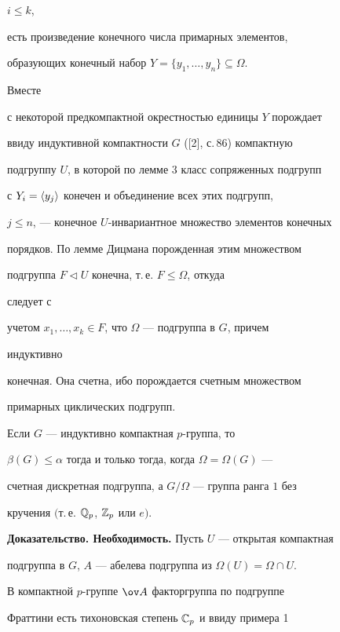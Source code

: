 $i\le k$, 


есть произведение конечного числа примарных элементов, 


образующих конечный набор $Y=\{y_1,\dotsc,y_n\}\subseteq\Omega$. 


Вместе 


с некоторой предкомпактной окрестностью единицы $Y$ порождает 


ввиду индуктивной компактности $G$ ([2], с.\,86) компактную 


подгруппу $U$, в которой по лемме 3 класс сопряженных подгрупп 


с $Y_i=\langle y_j\rangle$ конечен и объединение всех этих подгрупп, 


$j\le n$, --- конечное $U$-инвариантное множество элементов конечных 


порядков. По лемме Дицмана порожденная этим множеством  


подгруппа $F\triangleleft U$ конечна, т.\,е. $F\le\Omega$, откуда 


следует с  


учетом $x_1,\dotsc,x_k\in F$, что $\Omega$ --- подгруппа в $G$, причем 


индуктивно 


конечная. Она счетна, ибо порождается счетным множеством 


примарных циклических подгрупп. 


 


\begin{thm} 


Если $G$ --- индуктивно компактная $p$-группа, то 


$\beta(G)\le\alpha$ тогда и только тогда, когда $\Omega=\Omega(G)$ --- 


счетная дискретная подгруппа, а $G/\Omega$ --- группа ранга $1$ без  


кручения $($т.\,е. $\Bbb Q_p$, $\Bbb Z_p$ или $e)$. 


\end{thm} 


 


{\bf Доказательство. Необходимость.} Пусть $U$ --- открытая компактная 


подгруппа в $G$, $A$ --- абелева подгруппа из $\Omega(U)=\Omega\cap 


U$. 


В компактной $p$-группе $\ov A$ факторгруппа по подгруппе 


Фраттини есть тихоновская степень $\Bbb C_p$ и ввиду примера 1 



